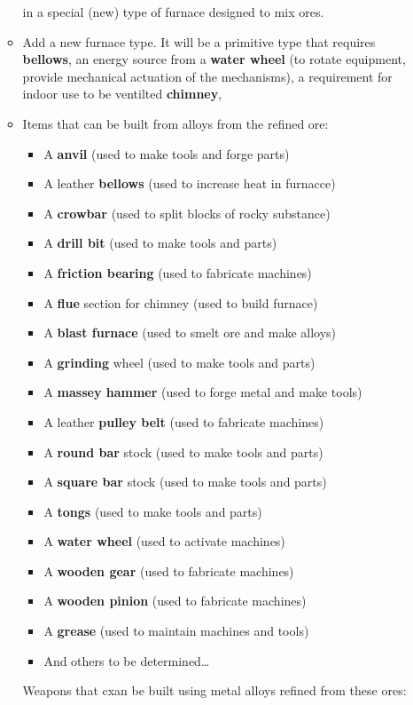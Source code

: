 \documentclass[12pt]{memoir}
\begin{document}
\begin{itemize}
\begin{itemize}
in a special (new) type of furnace designed to mix ores.  
\item Add a new furnace type. It will be a primitive type that 
requires {\textbf{bellows}}, an energy source from a {\textbf{water wheel}}
(to rotate equipment, provide mechanical actuation of the mechanisms), 
a requirement for indoor use to be ventilted {\textbf{chimney}},
\item Items that can be built from alloys from the refined ore:
 \begin{itemize}
    \item A {\textbf{anvil}}  (used to make tools and forge parts)
    \item A leather {\textbf{bellows}} (used to increase heat in furnacce)
    \item A {\textbf{crowbar}} (used to split blocks of rocky substance)
    \item A {\textbf{drill bit}} (used to make tools and parts)
    \item A {\textbf{friction bearing}} (used to fabricate machines)
    \item A {\textbf{flue}} section for chimney (used to build furnace)
    \item A {\textbf{blast furnace}} (used to smelt ore and make alloys)
    \item A {\textbf{grinding}} wheel (used to make tools and parts)
    \item A {\textbf{massey hammer}} (used to forge metal and make tools)
    \item A leather {\textbf{pulley belt}} (used to fabricate machines)
    \item A {\textbf{round bar}} stock (used to make tools and parts)
    \item A {\textbf{square bar}} stock (used to make tools and parts)
    \item A {\textbf{tongs}} (used to make tools and parts)
    \item A {\textbf{water wheel}} (used to activate machines)
    \item A {\textbf{wooden gear}} (used to fabricate machines)
    \item A {\textbf{wooden pinion}} (used to fabricate machines)
    \item A {\textbf{grease}} (used to maintain machines and tools)
    \item And others to be determined\ldots
 \end{itemize}

Weapons that cxan be built using metal alloys refined from these ores:


\end{itemize}
\end{itemize}
\end{document}
